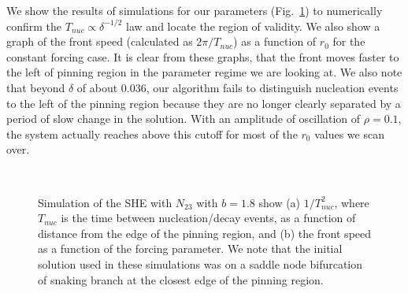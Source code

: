 \documentclass[pre,preprint,superscriptaddress]{revtex4-1}
\begin{document}
	We show the results of simulations  for our parameters (Fig.~\ref{fig:nucleation}) to numerically confirm the $T_{nuc}\propto \delta^{-1/2}$ law  and locate the region of validity.  We also show a graph of the front speed (calculated as $2 \pi / T_{nuc}$) as a function of $r_0$ for the constant forcing case.   It is clear from these graphs, that the front moves faster to the left of pinning region in the parameter regime we are looking at.  We also note that beyond $\delta$ of about 0.036, our algorithm fails to distinguish nucleation events to the left of the pinning region because they are no longer clearly separated by a period of slow change in the solution.  With an amplitude of oscillation of $\rho = 0.1$, the system actually reaches above this cutoff for most of the $r_0$ values we scan over.   

 \begin{figure}[!htb]
  \begin{center}
    \mbox{
       \quad
      }
    \caption{Simulation of the SHE with $N_{23}$ with $b=1.8$ show (a) $1/T_{nuc}^2$, where $T_{nuc}$ is the time between nucleation/decay events, as a function of distance from the edge of the pinning region, and (b) the front speed as a function of the forcing parameter. We note that the initial solution used in these simulations was on a saddle node bifurcation of snaking branch at the closest edge of the pinning region.}
    \label{fig:nucleation}
  \end{center}
\end{figure} 
\end{document}

